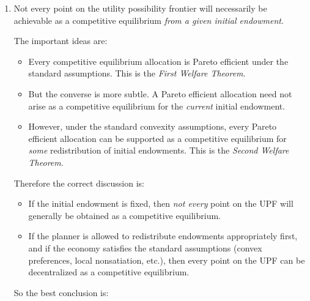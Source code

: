 \documentclass[12pt]{article}
\begin{document}
\begin{enumerate}[label=(\alph*)]
    Hence an appropriate social welfare function is
    \[
    \boxed{W(U_I,U_J)=U_I+6U_J.}
    \]
    Any positive scalar multiple of this is equivalent, for example
    \[
    2U_I+12U_J,\qquad \frac16 U_I+U_J,
    \]
    and so on.

    Graphically, the planner's social indifference curves are straight lines
    \[
    U_I+6U_J=\bar W
    \]
    or equivalently
    \[
    U_J=\frac{\bar W}{6}-\frac{1}{6}U_I,
    \]
    with slope
    \[
    -\frac{1}{6}.
    \]
    This matches the slope of the utility possibility frontier at \((1,3)\), confirming tangency there.

    Therefore:
    \[
    \boxed{\text{An appropriate weighted-utilitarian SWF is }W(U_I,U_J)=U_I+6U_J.}
    \]

    \item
    Not every point on the utility possibility frontier will necessarily be achievable as a competitive equilibrium \emph{from a given initial endowment}.

    The important ideas are:
    \begin{itemize}
        \item Every competitive equilibrium allocation is Pareto efficient under the standard assumptions. This is the \emph{First Welfare Theorem}.
        \item But the converse is more subtle. A Pareto efficient allocation need not arise as a competitive equilibrium for the \emph{current} initial endowment.
        \item However, under the standard convexity assumptions, every Pareto efficient allocation can be supported as a competitive equilibrium for \emph{some} redistribution of initial endowments. This is the \emph{Second Welfare Theorem}.
    \end{itemize}

    Therefore the correct discussion is:

    \begin{itemize}
        \item If the initial endowment is fixed, then \emph{not every} point on the UPF will generally be obtained as a competitive equilibrium.
        \item If the planner is allowed to redistribute endowments appropriately first, and if the economy satisfies the standard assumptions (convex preferences, local nonsatiation, etc.), then every point on the UPF can be decentralized as a competitive equilibrium.
    \end{itemize}

    So the best conclusion is:
    \begin{center}
    \end{center}
\end{enumerate}
\end{document}

